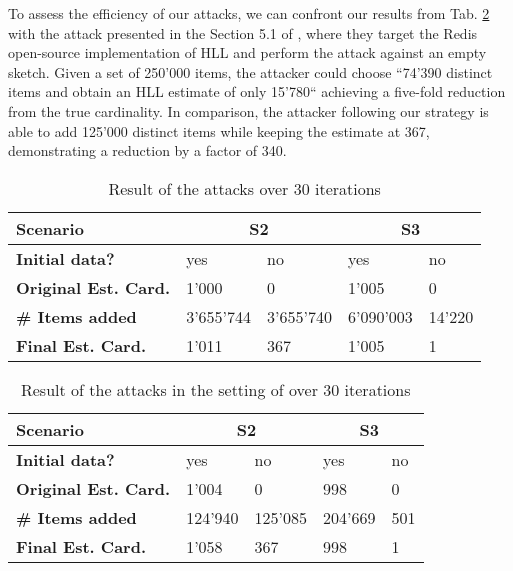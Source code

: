 \documentclass{IEEEtran}
\begin{document}
To assess the efficiency of our attacks, we can confront our results from Tab. \ref{table:tab2} with the attack presented in the Section 5.1 of \cite{hllvuln}, where they target the Redis \cite{redishll} open-source implementation of HLL and perform the attack against an empty sketch. Given a set of 250'000 items, the attacker could choose ``74'390 distinct items and obtain an HLL estimate of only 15'780`` achieving a five-fold reduction from the true cardinality. In comparison, the attacker following our strategy is able to add 125'000 distinct items while keeping the estimate at 367, demonstrating a reduction by a factor of 340. 

\begin{table}[h]
\caption{Result of the attacks over 30 iterations}
\begin{tabular}{| m{8.5em} | m{4em} | m{4em} | m{4em} | m{4em} |}
    \hline
    \textbf{Scenario} & \multicolumn{2}{c|}{S2} & \multicolumn{2}{c|}{S3} \\ \hline
    \textbf{Initial data?} & yes & no & yes & no \\ \hline
    \textbf{Original Est. Card.} & 1'000 & 0 & 1'005 & 0 \\ \hline
    \textbf{\# Items added} & 3'655'744 & 3'655'740 & 6'090'003 & 14'220 \\ \hline
    \textbf{Final Est. Card.} & 1'011 & 367 & 1'005 & 1 \\ \hline
\end{tabular}
\label{table:tab1}
\end{table}

\begin{table}[h]
\caption{Result of the attacks in the setting of \cite{hllvuln} over 30 iterations}
\begin{tabular}{| m{8.5em} | m{4em} | m{4em} | m{4em} | m{4em} |}
    \hline
    \textbf{Scenario} & \multicolumn{2}{c|}{S2} & \multicolumn{2}{c|}{S3} \\ \hline
    \textbf{Initial data?} & yes & no & yes & no \\ \hline
    \textbf{Original Est. Card.} & 1'004 & 0 & 998 & 0 \\ \hline
    \textbf{\# Items added} & 124'940 & 125'085 & 204'669 & 501 \\ \hline
    \textbf{Final Est. Card.} & 1'058 & 367 & 998 & 1 \\ \hline
\end{tabular}
\label{table:tab2}
\end{table}
\end{document}
